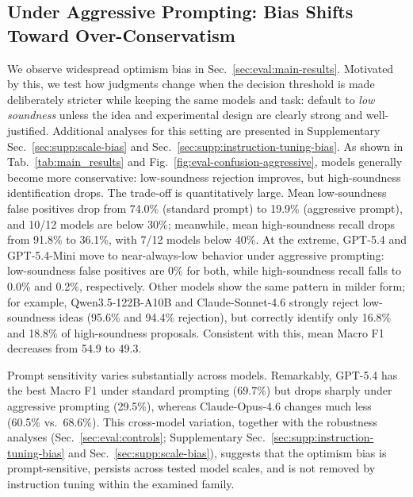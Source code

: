 \subsection{Under Aggressive Prompting: Bias Shifts Toward Over-Conservatism}\label{sec:eval:aggressive}\label{Sec: Under Aggressive Prompting: Optimism Bias Is Not Fixed, It Is Inverted}

 We observe widespread optimism bias in Sec.~\ref{sec:eval:main-results}. Motivated by this, we test how judgments change when the decision threshold is made deliberately stricter while keeping the same models and task: default to \textit{low soundness} unless the idea and experimental design are clearly strong and well-justified. Additional analyses for this setting are presented in Supplementary Sec.~\ref{sec:supp:scale-bias} and Sec.~\ref{sec:supp:instruction-tuning-bias}. As shown in Tab.~\ref{tab:main_results} and Fig.~\ref{fig:eval-confusion-aggressive}, models generally become more conservative: low-soundness rejection improves, but high-soundness identification drops. The trade-off is quantitatively large. Mean low-soundness false positives drop from 74.0\% (standard prompt) to 19.9\% (aggressive prompt), and 10/12 models are below 30\%; meanwhile, mean high-soundness recall drops from 91.8\% to 36.1\%, with 7/12 models below 40\%. At the extreme, GPT-5.4 and GPT-5.4-Mini move to near-always-low behavior under aggressive prompting: low-soundness false positives are 0\% for both, while high-soundness recall falls to 0.0\% and 0.2\%, respectively. Other models show the same pattern in milder form; for example, Qwen3.5-122B-A10B and Claude-Sonnet-4.6 strongly reject low-soundness ideas (95.6\% and 94.4\% rejection), but correctly identify only 16.8\% and 18.8\% of high-soundness proposals. Consistent with this, mean Macro F1 decreases from 54.9 to 49.3.

 Prompt sensitivity varies substantially across models. Remarkably, GPT-5.4 has the best Macro F1 under standard prompting (69.7\%) but drops sharply under aggressive prompting (29.5\%), whereas Claude-Opus-4.6 changes much less (60.5\% vs.\ 68.6\%). This cross-model variation, together with the robustness analyses (Sec.~\ref{sec:eval:controls}; Supplementary Sec.~\ref{sec:supp:instruction-tuning-bias} and Sec.~\ref{sec:supp:scale-bias}), suggests that the optimism bias is prompt-sensitive, persists across tested model scales, and is not removed by instruction tuning within the examined family.



